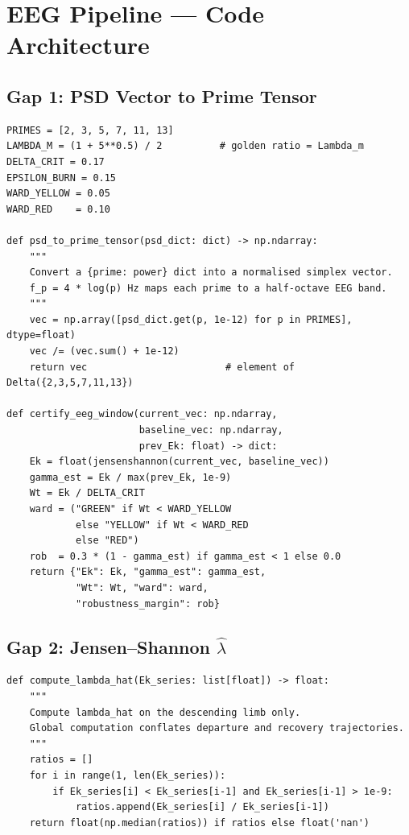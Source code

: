 \documentclass[12pt,a4paper]{article}
\theoremstyle{definition}
\newcommand{\lhat}{\hat{\lambda}}
\begin{document}
\section{EEG Pipeline — Code Architecture}

\subsection{Gap 1: PSD Vector to Prime Tensor}

\begin{lstlisting}[style=orfpython,caption={Gap 1: \texttt{certify\_eeg\_window()} — scalar hash replaced by PSD vector}]
PRIMES = [2, 3, 5, 7, 11, 13]
LAMBDA_M = (1 + 5**0.5) / 2          # golden ratio = Lambda_m
DELTA_CRIT = 0.17
EPSILON_BURN = 0.15
WARD_YELLOW = 0.05
WARD_RED    = 0.10

def psd_to_prime_tensor(psd_dict: dict) -> np.ndarray:
    """
    Convert a {prime: power} dict into a normalised simplex vector.
    f_p = 4 * log(p) Hz maps each prime to a half-octave EEG band.
    """
    vec = np.array([psd_dict.get(p, 1e-12) for p in PRIMES], dtype=float)
    vec /= (vec.sum() + 1e-12)
    return vec                        # element of Delta({2,3,5,7,11,13})

def certify_eeg_window(current_vec: np.ndarray,
                       baseline_vec: np.ndarray,
                       prev_Ek: float) -> dict:
    Ek = float(jensenshannon(current_vec, baseline_vec))
    gamma_est = Ek / max(prev_Ek, 1e-9)
    Wt = Ek / DELTA_CRIT
    ward = ("GREEN" if Wt < WARD_YELLOW
            else "YELLOW" if Wt < WARD_RED
            else "RED")
    rob  = 0.3 * (1 - gamma_est) if gamma_est < 1 else 0.0
    return {"Ek": Ek, "gamma_est": gamma_est,
            "Wt": Wt, "ward": ward,
            "robustness_margin": rob}
\end{lstlisting}

\subsection{Gap 2: Jensen--Shannon $\lhat$}

\begin{lstlisting}[style=orfpython,caption={Gap 2: JS contraction ratio on descending limb only}]
def compute_lambda_hat(Ek_series: list[float]) -> float:
    """
    Compute lambda_hat on the descending limb only.
    Global computation conflates departure and recovery trajectories.
    """
    ratios = []
    for i in range(1, len(Ek_series)):
        if Ek_series[i] < Ek_series[i-1] and Ek_series[i-1] > 1e-9:
            ratios.append(Ek_series[i] / Ek_series[i-1])
    return float(np.median(ratios)) if ratios else float('nan')
\end{lstlisting}
\end{document}
